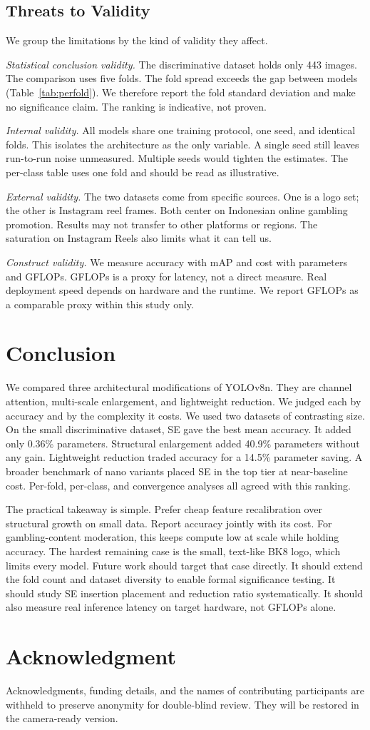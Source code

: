 \documentclass[conference,a4paper]{IEEEtran}
\begin{document}
\subsection{Threats to Validity}
We group the limitations by the kind of validity they affect.

\textit{Statistical conclusion validity.} The discriminative dataset holds
only 443 images. The comparison uses five folds. The fold spread exceeds the
gap between models (Table~\ref{tab:perfold}). We therefore report the fold
standard deviation and make no significance claim. The ranking is indicative,
not proven.

\textit{Internal validity.} All models share one training protocol, one seed,
and identical folds. This isolates the architecture as the only variable. A
single seed still leaves run-to-run noise unmeasured. Multiple seeds would
tighten the estimates. The per-class table uses one fold and should be read as
illustrative.

\textit{External validity.} The two datasets come from specific sources. One
is a logo set; the other is Instagram reel frames. Both center on Indonesian
online gambling promotion. Results may not transfer to other platforms or
regions. The saturation on Instagram Reels also limits what it can tell us.

\textit{Construct validity.} We measure accuracy with mAP and cost with
parameters and GFLOPs. GFLOPs is a proxy for latency, not a direct measure.
Real deployment speed depends on hardware and the runtime. We report GFLOPs as
a comparable proxy within this study only.

\section{Conclusion}
We compared three architectural modifications of YOLOv8n. They are channel
attention, multi-scale enlargement, and lightweight reduction. We judged each
by accuracy and by the complexity it costs. We used two datasets of
contrasting size. On the small discriminative dataset, SE gave the best mean
accuracy. It added only 0.36\% parameters. Structural enlargement added 40.9\%
parameters without any gain. Lightweight reduction traded accuracy for a
14.5\% parameter saving. A broader benchmark of nano variants placed SE in the
top tier at near-baseline cost. Per-fold, per-class, and convergence analyses
all agreed with this ranking.

The practical takeaway is simple. Prefer cheap feature recalibration over
structural growth on small data. Report accuracy jointly with its cost. For
gambling-content moderation, this keeps compute low at scale while holding
accuracy. The hardest remaining case is the small, text-like BK8 logo, which
limits every model. Future work should target that case directly. It should
extend the fold count and dataset diversity to enable formal significance
testing. It should study SE insertion placement and reduction ratio
systematically. It should also measure real inference latency on target
hardware, not GFLOPs alone.

\section*{Acknowledgment}
Acknowledgments, funding details, and the names of contributing participants
are withheld to preserve anonymity for double-blind review. They will be
restored in the camera-ready version.



\end{document}

